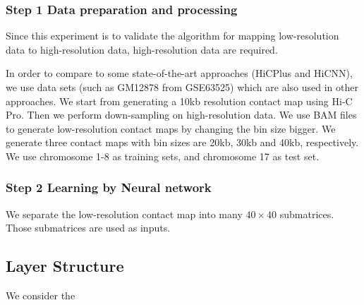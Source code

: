 \documentclass{article}
\begin{document}
\subsubsection*{Step 1 Data preparation and processing}
Since this experiment is to validate the algorithm for mapping low-resolution data to high-resolution data, 
high-resolution data are required. 

In order to compare to some state-of-the-art approaches (HiCPlus and HiCNN), 
we use data sets (such as GM12878 from GSE63525) which are also used in other approaches. 
We start from generating a 10kb resolution contact map 
using Hi-C Pro. 
Then we perform down-sampling on high-resolution data. 
We use BAM files to generate low-resolution contact maps by changing the bin size bigger. 
We generate three contact maps with bin sizes are 20kb, 30kb and 40kb, respectively. 
We use chromosome 1-8 as training sets, and chromosome 17 as test set.

\subsubsection*{Step 2 Learning by Neural network}
We separate the low-resolution contact map into many $40 \times 40$ submatrices. 
Those submatrices are used as inputs.

\subsection{Layer Structure}
We consider the 





 
\end{document}
